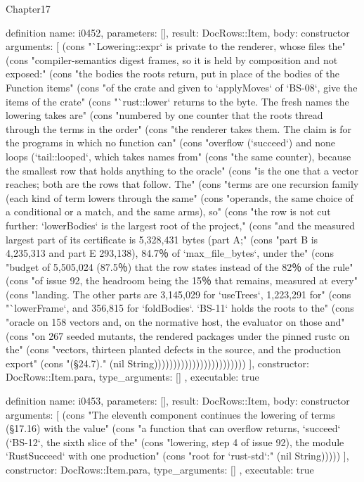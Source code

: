 \begin{lexlean}{Chapter17}
\begin{semanticmodule}
definition{
  name: i0452,
  parameters: [],
  result: DocRows::Item,
  body: constructor{
    arguments: [
      (cons "`Lowering::expr` is private to the renderer, whose files the" (cons "compiler-semantics digest frames, so it is held by composition and not exposed:" (cons "the bodies the roots return, put in place of the bodies of the Function items" (cons "of the crate and given to `applyMoves` of `BS-08`, give the items of the crate" (cons "`rust::lower` returns to the byte. The fresh names the lowering takes are" (cons "numbered by one counter that the roots thread through the terms in the order" (cons "the renderer takes them. The claim is for the programs in which no function can" (cons "overflow (`succeed`) and none loops (`tail::looped`, which takes names from" (cons "the same counter), because the smallest row that holds anything to the oracle" (cons "is the one that a vector reaches; both are the rows that follow. The" (cons "terms are one recursion family (each kind of term lowers through the same" (cons "operands, the same choice of a conditional or a match, and the same arms), so" (cons "the row is not cut further: `lowerBodies` is the largest root of the project," (cons "and the measured largest part of its certificate is 5,328,431 bytes (part A;" (cons "part B is 4,235,313 and part E 293,138), 84.7％ of `max_file_bytes`, under the" (cons "budget of 5,505,024 (87.5％) that the row states instead of the 82％ of the rule" (cons "of issue 92, the headroom being the 15％ that remains, measured at every" (cons "landing. The other parts are 3,145,029 for `useTrees`, 1,223,291 for" (cons "`lowerFrame`, and 356,815 for `foldBodies`. `BS-11` holds the roots to the" (cons "oracle on 158 vectors and, on the normative host, the evaluator on those and" (cons "on 267 seeded mutants, the rendered packages under the pinned rustc on the" (cons "vectors, thirteen planted defects in the source, and the production export" (cons "(§24.7)." (nil String))))))))))))))))))))))))
    ],
    constructor: DocRows::Item.para,
    type_arguments: []
  },
  executable: true
}

definition{
  name: i0453,
  parameters: [],
  result: DocRows::Item,
  body: constructor{
    arguments: [
      (cons "The eleventh component continues the lowering of terms (§17.16) with the value" (cons "a function that can overflow returns, `succeed` (`BS-12`, the sixth slice of the" (cons "lowering, step 4 of issue 92), the module `RustSucceed` with one production" (cons "root for `rust-std`:" (nil String)))))
    ],
    constructor: DocRows::Item.para,
    type_arguments: []
  },
  executable: true
}


\end{semanticmodule}
\end{lexlean}
